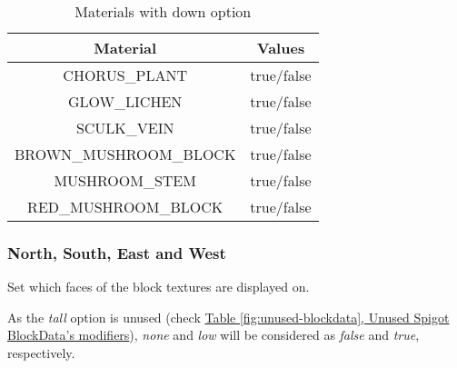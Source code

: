 \begin{table}[H]
	\centering
	\begin{tabular}{ |c|c| }
		\hline
		Material & Values \\
		\hline
		CHORUS\_PLANT & true/false \\
		GLOW\_LICHEN & true/false \\
		SCULK\_VEIN & true/false \\
		BROWN\_MUSHROOM\_BLOCK & true/false \\
		MUSHROOM\_STEM & true/false \\
		RED\_MUSHROOM\_BLOCK & true/false \\
		\hline
	\end{tabular}
	\caption{Materials with down option}
\end{table}

\subsubsection{North, South, East and West}
Set which faces of the block textures are displayed on.

As the \textit{tall} option is unused (check \hyperref[fig:unused-blockdata]{Table \ref{fig:unused-blockdata}, Unused Spigot BlockData's modifiers}), \textit{none} and \textit{low} will be considered as \textit{false} and \textit{true}, respectively.

